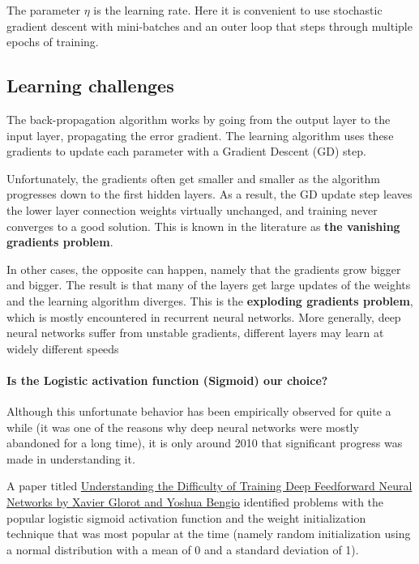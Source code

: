 \documentclass[%
oneside,                 %
final,                   %
10pt]{article}
\begin{document}
The parameter $\eta$ is the learning rate.
Here it is convenient to use stochastic gradient descent with mini-batches and an outer loop that steps through multiple epochs of training.


\subsection{Learning challenges}

The back-propagation algorithm works by going from
the output layer to the input layer, propagating the error gradient. The learning algorithm uses these
gradients to update each parameter with a Gradient Descent (GD) step.

Unfortunately, the gradients often get smaller and smaller as the
algorithm progresses down to the first hidden layers. As a result, the
GD update step leaves the lower layer connection weights
virtually unchanged, and training never converges to a good
solution. This is known in the literature as 
\textbf{the vanishing gradients problem}. 

In other cases, the opposite can happen, namely that the gradients grow bigger and
bigger. The result is that many of the layers get large updates of the 
weights and the learning algorithm diverges. This is the \textbf{exploding gradients problem}, which is mostly encountered in recurrent neural networks. More generally, deep neural networks suffer from unstable gradients, different layers may learn at widely different speeds

\paragraph{Is the Logistic activation function (Sigmoid) our choice?}
Although this unfortunate behavior has been empirically observed for
quite a while (it was one of the reasons why deep neural networks were
mostly abandoned for a long time), it is only around 2010 that
significant progress was made in understanding it.

A paper titled \href{{http://proceedings.mlr.press/v9/glorot10a.html}}{Understanding the Difficulty of Training Deep
Feedforward Neural Networks by Xavier Glorot and Yoshua Bengio} identified problems with the popular logistic
sigmoid activation function and the weight initialization technique
that was most popular at the time (namely random initialization using
a normal distribution with a mean of 0 and a standard deviation of
1). 
\end{document}
